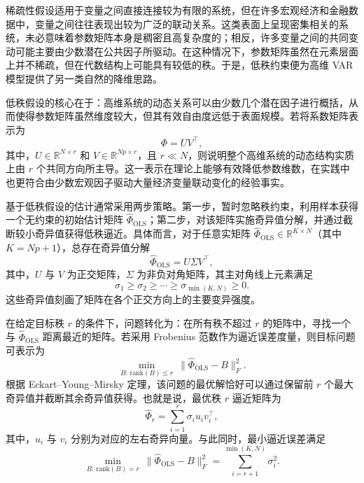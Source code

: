 稀疏性假设适用于变量之间直接连接较为有限的系统，但在许多宏观经济和金融数据中，变量之间往往表现出较为广泛的联动关系。这类表面上呈现密集相关的系统，未必意味着参数矩阵本身是稠密且高复杂度的；相反，许多变量之间的共同变动可能主要由少数潜在公共因子所驱动。在这种情况下，参数矩阵虽然在元素层面上并不稀疏，但在代数结构上可能具有较低的秩。于是，低秩约束便为高维 VAR 模型提供了另一类自然的降维思路。

低秩假设的核心在于：高维系统的动态关系可以由少数几个潜在因子进行概括，从而使得参数矩阵虽然维度较大，但其有效自由度远低于表面规模。若将系数矩阵表示为
\begin{equation}
 \Phi=UV^{\top},
\end{equation}
其中，$U\in\mathbb{R}^{N\times r}$ 和 $V\in\mathbb{R}^{Np\times r}$，且 $r\ll N$，则说明整个高维系统的动态结构实质上由 $r$ 个共同方向所主导。这一表示在理论上能够有效降低参数维数，在实践中也更符合由少数宏观因子驱动大量经济变量联动变化的经验事实。

基于低秩假设的估计通常采用两步策略。第一步，暂时忽略秩约束，利用样本获得一个无约束的初始估计矩阵 $\hat{\Phi}_{\mathrm{OLS}}$；第二步，对该矩阵实施奇异值分解，并通过截断较小奇异值获得低秩逼近。具体而言，对于任意实矩阵 $\hat{\Phi}_{\mathrm{OLS}}\in\mathbb{R}^{K\times N}$（其中 $K=Np+1$），总存在奇异值分解
\begin{equation}
 \hat{\Phi}_{\mathrm{OLS}}=U\Sigma V^{\top},
\end{equation}
其中，$U$ 与 $V$ 为正交矩阵，$\Sigma$ 为非负对角矩阵，其主对角线上元素满足
\begin{equation}
 \sigma_1\geq \sigma_2\geq \cdots \geq \sigma_{\min(K,N)}\geq 0.
\end{equation}
这些奇异值刻画了矩阵在各个正交方向上的主要变异强度。

在给定目标秩 $r$ 的条件下，问题转化为：在所有秩不超过 $r$ 的矩阵中，寻找一个与 $\hat{\Phi}_{\mathrm{OLS}}$ 距离最近的矩阵。若采用 Frobenius 范数作为逼近误差度量，则目标问题可表示为
\begin{equation}
 \min_{B:\,\mathrm{rank}(B)\leq r}\ \lVert \hat{\Phi}_{\mathrm{OLS}}-B\rVert_F^2.
\end{equation}
根据 Eckart--Young--Mirsky 定理，该问题的最优解恰好可以通过保留前 $r$ 个最大奇异值并截断其余奇异值获得。也就是说，最优秩 $r$ 逼近矩阵为
\begin{equation}
 \hat{\Phi}_r=\sum_{i=1}^{r}\sigma_i u_i v_i^{\top},
\end{equation}
其中，$u_i$ 与 $v_i$ 分别为对应的左右奇异向量。与此同时，最小逼近误差满足
\begin{equation}
 \min_{B:\,\mathrm{rank}(B)=r}\ \lVert \hat{\Phi}_{\mathrm{OLS}}-B\rVert_F^2
 =\sum_{i=r+1}^{\min(K,N)}\sigma_i^2.
\end{equation}

